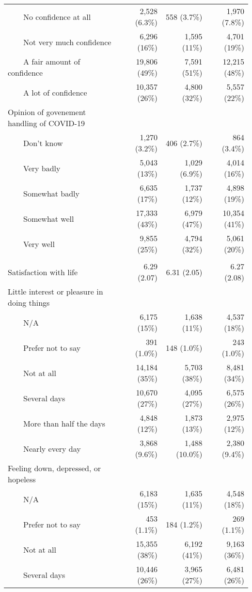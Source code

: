 \documentclass[
]{article}
\begin{document}
\begin{longtable}{lrrr}
    No confidence at all & 2,528 (6.3\%) & 558 (3.7\%) & 1,970 (7.8\%) \\ 
    Not very much confidence & 6,296 (16\%) & 1,595 (11\%) & 4,701 (19\%) \\ 
    A fair amount of confidence & 19,806 (49\%) & 7,591 (51\%) & 12,215 (48\%) \\ 
    A lot of confidence & 10,357 (26\%) & 4,800 (32\%) & 5,557 (22\%) \\ 
Opinion of govenement handling of COVID-19 &  &  &  \\ 
    Don't know & 1,270 (3.2\%) & 406 (2.7\%) & 864 (3.4\%) \\ 
    Very badly & 5,043 (13\%) & 1,029 (6.9\%) & 4,014 (16\%) \\ 
    Somewhat badly & 6,635 (17\%) & 1,737 (12\%) & 4,898 (19\%) \\ 
    Somewhat well & 17,333 (43\%) & 6,979 (47\%) & 10,354 (41\%) \\ 
    Very well & 9,855 (25\%) & 4,794 (32\%) & 5,061 (20\%) \\ 
\midrule\addlinespace[2.5pt]
\multicolumn{4}{l}{Health, mental health and wellbeing} \\ 
\midrule\addlinespace[2.5pt]
Satisfaction with life & 6.29 (2.07) & 6.31 (2.05) & 6.27 (2.08) \\ 
Little interest or pleasure in doing things &  &  &  \\ 
    N/A & 6,175 (15\%) & 1,638 (11\%) & 4,537 (18\%) \\ 
    Prefer not to say & 391 (1.0\%) & 148 (1.0\%) & 243 (1.0\%) \\ 
    Not at all & 14,184 (35\%) & 5,703 (38\%) & 8,481 (34\%) \\ 
    Several days & 10,670 (27\%) & 4,095 (27\%) & 6,575 (26\%) \\ 
    More than half the days & 4,848 (12\%) & 1,873 (13\%) & 2,975 (12\%) \\ 
    Nearly every day & 3,868 (9.6\%) & 1,488 (10.0\%) & 2,380 (9.4\%) \\ 
Feeling down, depressed, or hopeless &  &  &  \\ 
    N/A & 6,183 (15\%) & 1,635 (11\%) & 4,548 (18\%) \\ 
    Prefer not to say & 453 (1.1\%) & 184 (1.2\%) & 269 (1.1\%) \\ 
    Not at all & 15,355 (38\%) & 6,192 (41\%) & 9,163 (36\%) \\ 
    Several days & 10,446 (26\%) & 3,965 (27\%) & 6,481 (26\%) \\ 

\end{longtable}
\end{document}
